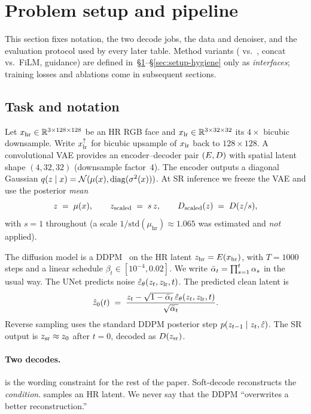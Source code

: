 \section{Problem setup and pipeline}
\label{sec:setup}

This section fixes notation, the two decode jobs, the data and
denoiser, and the evaluation protocol used by every later table.
Method variants (\vaeone{} vs.\ \vaesr, concat vs.\ FiLM, guidance)
are defined in~\S\ref{sec:setup}--\S\ref{sec:setup-hygiene} only as
\emph{interfaces}; training losses and ablations come in subsequent
sections.

\subsection{Task and notation}
\label{sec:notation}

Let $x_{\mathrm{hr}}\in\mathbb{R}^{3\times 128\times 128}$ be an HR RGB face and
$x_{\mathrm{lr}}\in\mathbb{R}^{3\times 32\times 32}$ its $4\times$ bicubic
downsample.
Write $x_{\mathrm{lr}}^{\uparrow}$ for bicubic upsample of $x_{\mathrm{lr}}$ back to $128\times 128$.
A convolutional VAE provides an encoder--decoder pair
$(E,D)$ with spatial latent shape $(4,32,32)$ (downsample
factor~$4$).
The encoder outputs a diagonal Gaussian
$q(z\mid x)=\mathcal{N}(\mu(x),\mathrm{diag}(\sigma^2(x)))$.
At SR inference we freeze the VAE and use the posterior
\emph{mean}
\begin{equation}
  \label{eq:latent-mean}
  z \;=\; \mu(x),\qquad
  z_{\mathrm{scaled}} \;=\; s\,z,\qquad
  D_{\mathrm{scaled}}(z) \;=\; D(z/s),
\end{equation}
with $s{=}1$ throughout (a scale $1/\mathrm{std}(\mu_{\mathrm{hr}})\approx 1.065$
was estimated and \emph{not} applied).

The diffusion model is a DDPM~\citep{ho2020denoising} on the HR
latent $z_{\mathrm{hr}}=E(x_{\mathrm{hr}})$, with $T{=}1000$ steps and a linear
schedule $\beta_t\in[10^{-4},0.02]$.
We write $\bar{\alpha}_{t}=\prod_{s=1}^{t}\alpha_s$ in the usual way.
The UNet predicts noise $\hat{\varepsilon}_\theta(z_{t},z_{\mathrm{lr}},t)$.
The predicted clean latent is
\begin{equation}
  \label{eq:z0hat}
  \hat{z}_{0}(t)
  \;=\;
  \frac{z_{t} - \sqrt{1-\bar{\alpha}_{t}}\,\hat{\varepsilon}_\theta(z_{t},z_{\mathrm{lr}},t)}{\sqrt{\bar{\alpha}_{t}}}.
\end{equation}
Reverse sampling uses the standard DDPM posterior step
$p(z_{t-1}\mid z_{t},\hat{\varepsilon})$.
The SR output is $z_{\mathrm{sr}}\approx z_0$ after $t{=}0$, decoded as
$D(z_{\mathrm{sr}})$.

\paragraph{Two decodes.}
 is the wording constraint for the rest of the
paper.
Soft-decode reconstructs the \emph{condition}.
\lsrmethod{} samples an HR latent.
We never say that the DDPM ``overwrites a better reconstruction.''

